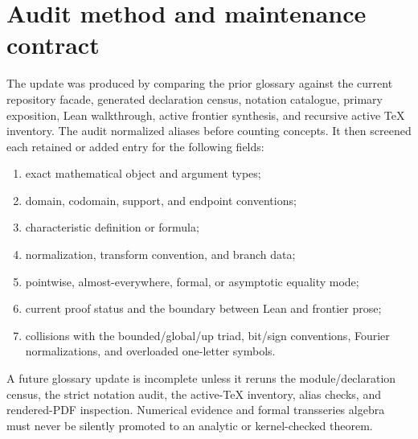 \documentclass[11pt,oneside]{article}
\begin{document}
\section{Audit method and maintenance contract}
The update was produced by comparing the prior glossary against the current
repository facade, generated declaration census, notation catalogue, primary
exposition, Lean walkthrough, active frontier synthesis, and recursive active
TeX inventory.  The audit normalized aliases before counting concepts.  It
then screened each retained or added entry for the following fields:
\begin{enumerate}
\item exact mathematical object and argument types;
\item domain, codomain, support, and endpoint conventions;
\item characteristic definition or formula;
\item normalization, transform convention, and branch data;
\item pointwise, almost-everywhere, formal, or asymptotic equality mode;
\item current proof status and the boundary between Lean and frontier prose;
\item collisions with the bounded/global/up triad, bit/sign conventions,
Fourier normalizations, and overloaded one-letter symbols.
\end{enumerate}
A future glossary update is incomplete unless it reruns the module/declaration
census, the strict notation audit, the active-TeX inventory, alias checks, and
rendered-PDF inspection.  Numerical evidence and formal transseries algebra
must never be silently promoted to an analytic or kernel-checked theorem.
\end{document}
